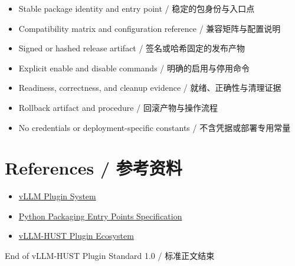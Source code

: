 \documentclass[11pt,a4paper,fontset=none]{ctexart}
\begin{document}
\begin{tcolorbox}[colback=white,colframe=Teal,arc=0pt,title=\textbf{Operator handoff / 运维交付}]
\begin{itemize}[label=$\square$]
  \item Stable package identity and entry point / 稳定的包身份与入口点
  \item Compatibility matrix and configuration reference / 兼容矩阵与配置说明
  \item Signed or hashed release artifact / 签名或哈希固定的发布产物
  \item Explicit enable and disable commands / 明确的启用与停用命令
  \item Readiness, correctness, and cleanup evidence / 就绪、正确性与清理证据
  \item Rollback artifact and procedure / 回滚产物与操作流程
  \item No credentials or deployment-specific constants / 不含凭据或部署专用常量
\end{itemize}
\end{tcolorbox}

\section{References / 参考资料}

\begin{itemize}
  \item \href{https://docs.vllm.ai/en/latest/design/plugin_system/}{vLLM Plugin System}
  \item \href{https://packaging.python.org/en/latest/specifications/entry-points/}{Python Packaging Entry Points Specification}
  \item \href{https://vllm-hust.sage.org.ai/plugins.html}{vLLM-HUST Plugin Ecosystem}
\end{itemize}

\vfill
\begin{center}
\textcolor{Slate}{\small End of vLLM-HUST Plugin Standard 1.0 / 标准正文结束}
\end{center}
\end{document}
